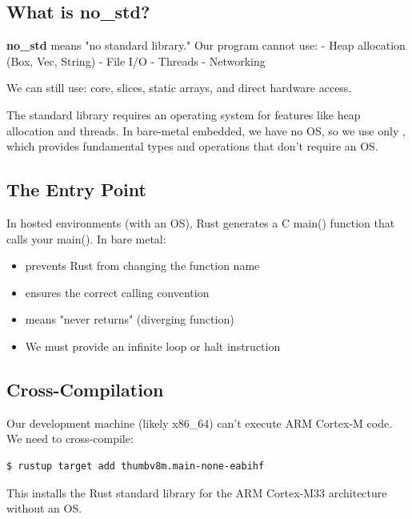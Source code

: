 \subsection{What is no_std?}

\begin{notebox}
    \textbf{no_std} means "no standard library." Our program cannot use:
    - Heap allocation (Box, Vec, String)
    - File I/O
    - Threads
    - Networking

    We can still use: core, slices, static arrays, and direct hardware access.
\end{notebox}

The standard library requires an operating system for features like heap allocation and threads. In bare-metal embedded, we have no OS, so we use only , which provides fundamental types and operations that don't require an OS.

\subsection{The Entry Point}

In hosted environments (with an OS), Rust generates a C main() function that calls your main(). In bare metal:

\begin{itemize}
    \item \codeinline{#[no_mangle]} prevents Rust from changing the function name
    \item {} ensures the correct calling convention
    \item \codeinline{-> !} means "never returns" (diverging function)
    \item We must provide an infinite loop or halt instruction
\end{itemize}

\subsection{Cross-Compilation}

Our development machine (likely x86_64) can't execute ARM Cortex-M code. We need to cross-compile:

\begin{verbatim}
$ rustup target add thumbv8m.main-none-eabihf
\end{verbatim}

This installs the Rust standard library for the ARM Cortex-M33 architecture without an OS.

